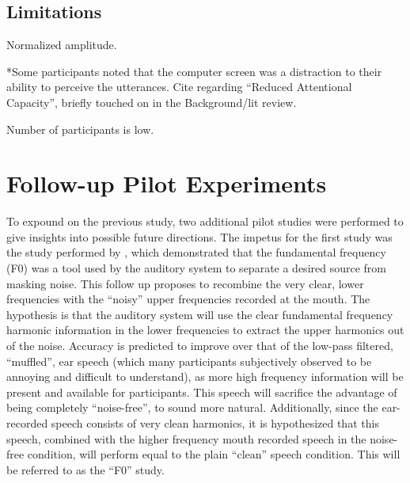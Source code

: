 \documentclass[dissertation,copyright]{uathesis}
\begin{document}
\subsection{Limitations}

Normalized amplitude.

*Some participants noted that the computer screen was a distraction to their ability to perceive the utterances. Cite \cite{mattys:13} regarding ``Reduced Attentional Capacity'', briefly touched on in the Background/lit review.

Number of participants is low.


\section{Follow-up Pilot Experiments}

To expound on the previous study, two additional pilot studies were performed to give insights into possible future directions.  The impetus for the first study was the study performed by \cite{bird:98}, which demonstrated that the fundamental frequency (F0) was a tool used by the auditory system to separate a desired source from masking noise.  This follow up proposes to recombine the very clear, lower frequencies with the ``noisy'' upper frequencies recorded at the mouth.  The hypothesis is that the auditory system will use the clear fundamental frequency harmonic information in the lower frequencies to extract the upper harmonics out of the noise.  Accuracy is predicted to improve over that of the low-pass filtered, ``muffled'', ear speech (which many participants subjectively observed to be annoying and difficult to understand), as more high frequency information will be present and available for participants.  This speech will sacrifice the advantage of being completely ``noise-free'', to sound more natural.  Additionally, since the ear-recorded speech consists of very clean harmonics, it is hypothesized that this speech, combined with the higher frequency mouth recorded speech in the noise-free condition, will perform equal to the plain ``clean'' speech condition. This will be referred to as the ``F0'' study.
\end{document}
